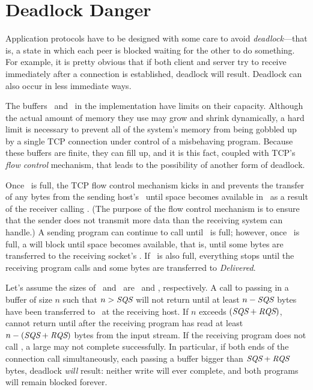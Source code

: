 \section{Deadlock Danger}
\label{sect:deadlock}%

Application protocols have to be designed with some care to avoid
\emph{deadlock}---that is, a state in which each peer is blocked
waiting for the other to do something.  For example, it is pretty
obvious that if both client and server try to receive immediately
after a connection is established, deadlock will result.  Deadlock can
also occur in less immediate ways.

The buffers \sque\ and \rque\ in the implementation have
limits on their capacity.  Although the actual amount of memory they
use may grow and shrink dynamically, a hard limit is necessary to
prevent all of the system's memory from being gobbled up by a single
TCP connection under control of a misbehaving program.  Because these
buffers are finite, they can fill up, and it is this fact, coupled
with TCP's \emph{flow control} mechanism, that leads to the
possibility of another form of deadlock.

Once \rque\ is full, the TCP {flow control} mechanism kicks in
and prevents the transfer of any bytes from the sending host's
\sque\ until space becomes available in \rque\ as a
result of the receiver calling .
(The purpose of the flow
control mechanism is to ensure that the sender does not transmit more
data than the receiving system can handle.)  A sending program can
continue to call  until \sque\ is full; however, once
\sque\ is full, a  will block until space
becomes available, that is, until some bytes are transferred to the
receiving socket's \rque.  If \rque\ is also full,
everything stops until the receiving program calls
 and some bytes are transferred
to \emph{Delivered}.

Let's assume the sizes of \sque\ and \rque\ are
\sqsize\ and \rqsize, respectively.  A
call to  passing in a buffer of size $n$
such that $n > \textit{SQS}$ will not return until at least
$n-\textit{SQS}$ bytes have been transferred to \rque\ at the
receiving host.  If $n$ exceeds $(\textit{SQS} +\textit{RQS})$,
 cannot return until after the
receiving program has read at least $n-(\textit{SQS} +\textit{RQS})$ bytes
from the input stream.  If the receiving program does not call
, a large
 may not complete successfully.  In
particular, if both ends of the connection call
 simultaneously, each passing a buffer
bigger than $\textit{SQS} + \textit{RQS}$ bytes,
deadlock \emph{will\/} result: neither write will ever complete, and both
programs will remain blocked forever.

